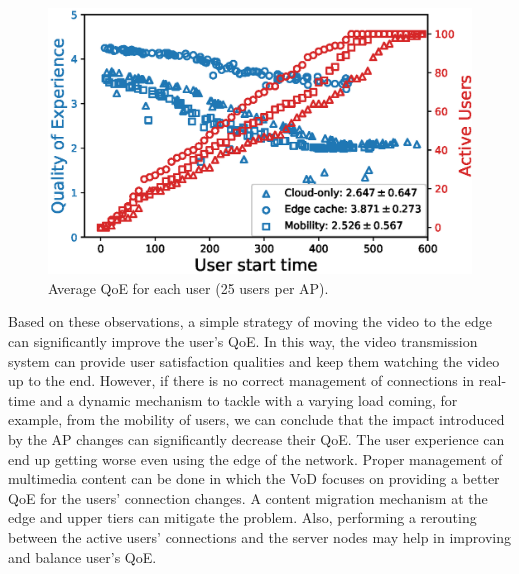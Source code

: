 \begin{figure}[!htb]
    \centering
    \includegraphics[width=\linewidth]{images/UserQoExUserStartTime25users-2.eps}
    \vspace{-0.4cm}
    \caption{Average QoE for each user (25 users per AP).}
    \label{fig:exp-setup-25}
\end{figure}

Based on these observations,
a simple strategy of moving the video to the edge can significantly improve the user's QoE. In this way, the video transmission system can provide user satisfaction qualities and keep them watching the video up to the end. However, if there is no correct management of connections in real-time and a dynamic mechanism to tackle with a varying load coming, for example, from the mobility of users, we can conclude that the impact introduced by the AP changes can significantly decrease their QoE. The user experience can end up getting worse even using the edge of the network. Proper management of multimedia content can be done in which the VoD focuses on providing a better QoE for the users' connection changes. A content migration mechanism at the edge and upper tiers can mitigate the problem. Also, performing a rerouting between the active users' connections and the server nodes may help in improving and balance user's QoE.

